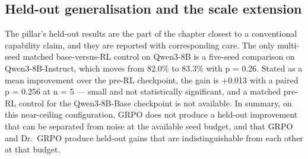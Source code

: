 \documentclass[12pt,a4paper]{report}
\begin{document}
\subsection{Held-out generalisation and the scale
extension}\label{held-out-generalisation-and-the-scale-extension}

The pillar's held-out results are the part of the chapter closest to a
conventional capability claim, and they are reported with corresponding
care. The only multi-seed matched base-versus-RL control on Qwen3-8B is
a five-seed comparison on Qwen3-8B-Instruct, which moves from 82.0\% to
83.3\% with p = 0.26. Stated as a mean improvement over the pre-RL
checkpoint, the gain is +0.013 with a paired p = 0.256 at n = 5 ---
small and not statistically significant, and a matched pre-RL control
for the Qwen3-8B-Base checkpoint is not available. In summary, on this
near-ceiling configuration, GRPO does not produce a held-out improvement
that can be separated from noise at the available seed budget, and that
GRPO and Dr.~GRPO produce held-out gains that are indistinguishable from
each other at that budget.
\end{document}
